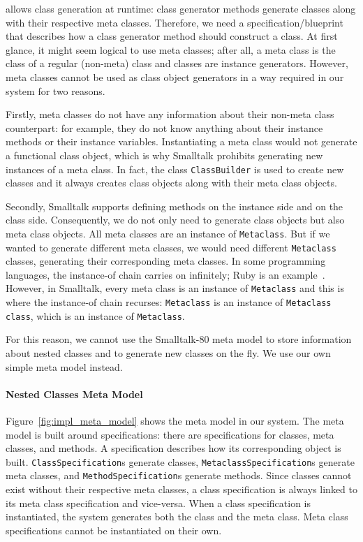 \msname allows class generation at runtime: class generator methods generate classes along with their respective meta classes. Therefore, we need a specification/blueprint that describes how a class generator method should construct a class. At first glance, it might seem logical to use meta classes; after all, a meta class is the class of a regular (non-meta) class and classes are instance generators. However, meta classes cannot be used as class object generators in a way required in our system for two reasons.

Firstly, meta classes do not have any information about their non-meta class counterpart: for example, they do not know anything about their instance methods or their instance variables. Instantiating a meta class would not generate a functional class object, which is why Smalltalk prohibits generating new instances of a meta class. In fact, the class \texttt{ClassBuilder} is used to create new classes and it always creates class objects along with their meta class objects.

Secondly, Smalltalk supports defining methods on the instance side and on the class side. Consequently, we do not only need to generate class objects but also meta class objects. All meta classes are an instance of \texttt{Metaclass}. But if we wanted to generate different meta classes, we would need different \texttt{Metaclass} classes, generating their corresponding meta classes. In some programming languages, the instance-of chain carries on infinitely; Ruby is an example~\cite{pavlata2012ruby}. However, in Smalltalk, every meta class is an instance of \texttt{Metaclass} and this is where the instance-of chain recurses: \texttt{Metaclass} is an instance of \texttt{Metaclass class}, which is an instance of \texttt{Metaclass}.

For this reason, we cannot use the Smalltalk-80 meta model to store information about nested classes and to generate new classes on the fly. We use our own simple meta model instead.

\paragraph{Nested Classes Meta Model}
Figure~\ref{fig:impl_meta_model} shows the meta model in our system. The meta model is built around specifications: there are specifications for classes, meta classes, and methods. A specification describes how its corresponding object is built. \texttt{ClassSpecification}s generate classes, \texttt{MetaclassSpecification}s generate meta classes, and \texttt{MethodSpecification}s generate methods. Since classes cannot exist without their respective meta classes, a class specification is always linked to its meta class specification and vice-versa. When a class specification is instantiated, the system generates both the class and the meta class. Meta class specifications cannot be instantiated on their own.

